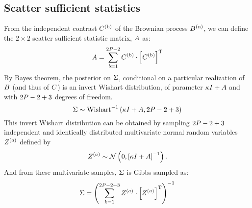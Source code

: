 \subsection{Scatter sufficient statistics}
From the independent contrast $C^{(\text{b})}$ of the Brownian process $B^{(\text{n})}$, we can define the $2 \times 2$ scatter sufficient statistic matrix, $A$ as:
\begin{equation}
    A = \sum\limits_{b=1}^{2 P - 2} C^{(\text{b})} \cdot \left[C^{(\text{b})}\right]^{\text{T}}
\end{equation}
By Bayes theorem, the {posterior} on $\Sigma$, conditional on a particular realization of $B$ (and thus of $C$) is an invert Wishart distribution, of parameter $\kappa I + A$ and with $2 P - 2 + 3$ degrees of freedom.
\begin{equation}
    \Sigma \sim \text{Wishart}^{-1}\left( \kappa I + A, 2 P - 2 + 3\right)
\end{equation}
This invert Wishart distribution can be obtained by sampling $2 P - 2 + 3$ independent and identically distributed multivariate normal random variables $Z^{(a)}$ defined by
\begin{equation}
    Z^{(a)} \sim \mathcal{N} \left( 0, \left[\kappa I + A\right]^{-1} \right).
\end{equation}
And from these multivariate samples, $\Sigma$ is Gibbs sampled as:
\begin{equation}
    \Sigma = \left( \sum\limits_{k=1}^{2 P - 2 + 3} Z^{(a)} \cdot \left[Z^{(a)} \right] ^{\text{T}} \right)^{-1}
\end{equation}